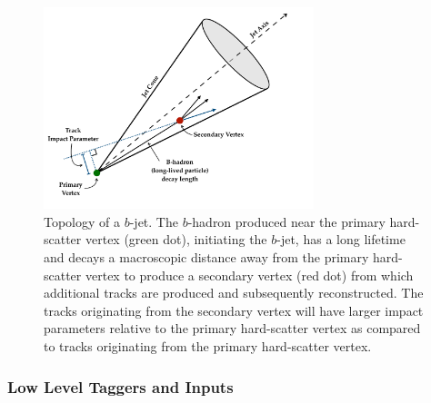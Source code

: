 \begin{figure}[!htb]
    \begin{center}
        \includegraphics[width=0.7\textwidth]{figures/chapter3/ftag/bhadron_decayPDF}
        \caption{
            Topology of a $b$-jet.
            The $b$-hadron produced near the primary hard-scatter vertex (green dot), initiating the
            $b$-jet, has a long lifetime and decays a macroscopic distance away from the primary
            hard-scatter vertex to produce a secondary vertex (red dot) from which additional tracks
            are produced and subsequently reconstructed.
            The tracks originating from the secondary vertex will have larger impact parameters relative
            to the primary hard-scatter vertex as compared to tracks originating from the primary
            hard-scatter vertex.
        }
        \label{fig:bjet_decay}
    \end{center}
\end{figure}

\subsubsection{Low Level Taggers and Inputs}
\label{sec:ftag_low_level}

